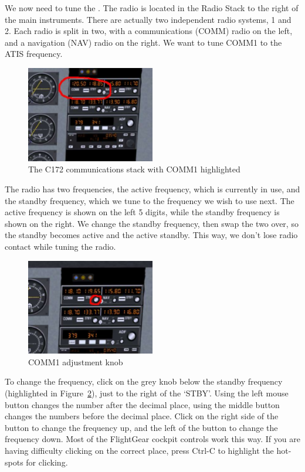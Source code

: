 We now need to tune the . The radio is located in the Radio
Stack to the right of the main instruments. There are actually two
independent radio systems, 1 and 2.  Each radio is split in two,
with a communications (COMM) radio on the left, and a navigation
(NAV) radio on the right. We want to tune COMM1 to the ATIS frequency.

\begin{figure}[!htp]
\centering
\includegraphics[width=0.5\textwidth]{comm1}
\caption{The C172 communications stack with COMM1 highlighted\label{comm1}}
\end{figure}

The radio has two frequencies, the active frequency, which is currently in use,
and the standby frequency, which we tune to the frequency we wish to use next.
The active frequency is shown on the left 5 digits, while the standby frequency
is shown on the right. We change the standby frequency, then swap the two over,
so the standby becomes active and the active standby. This way, we don't lose
radio contact while tuning the radio.

\begin{figure}[!htp]
\centering
\includegraphics[width=0.5\textwidth]{comm1_knob}
\caption{COMM1 adjustment knob\label{comm1knob}}
\end{figure}

To change the frequency, click on the grey knob below the standby frequency
(highlighted in Figure~\ref{comm1knob}), just to the right of the `STBY'.
Using the left mouse button changes the number after the decimal place,
using the middle button changes the numbers before the decimal place.
Click on the right side of the button to change the frequency up, and
the left of the button to change the frequency down. Most of the FlightGear
cockpit controls work this way. If you are having difficulty clicking on the
correct place, press Ctrl-C to highlight the hot-spots for clicking.

